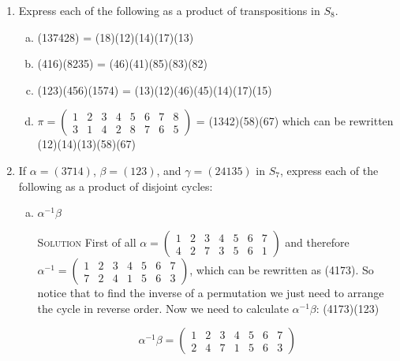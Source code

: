 \documentclass[twoside]{amsart}
\newcommand{\solution}{\textsc{Solution}\xspace}
\begin{document}
\begin{enumerate}[A.]
\begin{enumerate}[1]
      \item Express each of the following as a product of transpositions
      in $S_8$.

      \begin{enumerate}[(a)]
         \item (137428) = (18)(12)(14)(17)(13)

	 \item (416)(8235) = (46)(41)(85)(83)(82)

	 \item (123)(456)(1574) = (13)(12)(46)(45)(14)(17)(15)

	 \item $\pi = \begin{pmatrix}
	                 1 & 2 & 3 & 4 & 5 & 6 & 7 & 8 \\
			 3 & 1 & 4 & 2 & 8 & 7 & 6 & 5
	              \end{pmatrix}$ = (1342)(58)(67) which
		      can be rewritten (12)(14)(13)(58)(67)
      \end{enumerate}

      \item If $\alpha = (3714)$, $\beta = (123)$, and $\gamma = (24135)$
      in $S_7$, express each of the following as a product of disjoint cycles:

      \begin{enumerate}[(a)]
         \item $\alpha^{-1}\beta$

	 \solution First of all $\alpha = 
	    \begin{pmatrix}
	       1 & 2 & 3 & 4 & 5 & 6 & 7 \\
	       4 & 2 & 7 & 3 & 5 & 6 & 1
	    \end{pmatrix}$ and therefore $\alpha^{-1} = 
	    \begin{pmatrix}
	       1 & 2 & 3 & 4 & 5 & 6 & 7 \\
	       7 & 2 & 4 & 1 & 5 & 6 & 3
	    \end{pmatrix}$, which can be rewritten as (4173). So notice
	    that to find the inverse of a permutation we just need to arrange
	    the cycle in reverse order. Now we need to calculate
	    $\alpha^{-1}\beta$: (4173)(123)

	    \[ \alpha^{-1}\beta = 
	       \begin{pmatrix}
	          1 & 2 & 3 & 4 & 5 & 6 & 7 \\
		  2 & 4 & 7 & 1 & 5 & 6 & 3
	       \end{pmatrix}
	    \]


\end{enumerate}
\end{enumerate}
\end{enumerate}
\end{document}
